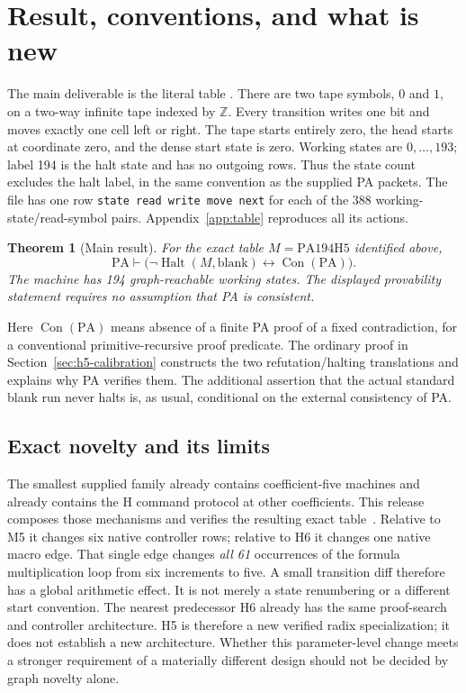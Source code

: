 \documentclass[11pt]{article}
\newtheorem{theorem}{Theorem}[section]
\theoremstyle{definition}\newtheorem{definition}[theorem]{Definition}
\newcommand{\PA}{\mathrm{PA}}
\newcommand{\file}[1]{\path{#1}}
\newcommand{\Con}{\operatorname{Con}}
\newcommand{\Halt}{\operatorname{Halt}}
\begin{document}
\section{Result, conventions, and what is new}

The main deliverable is the literal table \file{machine/machine.tm}.
There are two tape symbols, $0$ and $1$, on a two-way infinite tape indexed
by $\mathbb Z$. Every transition writes one bit and moves exactly one cell
left or right. The tape starts entirely zero, the head starts at coordinate
zero, and the dense start state is zero. Working states are $0,\ldots,193$;
label 194 is the halt state and has no outgoing rows. Thus the state count
excludes the halt label, in the same convention as the supplied PA packets.
The file has one row \texttt{state read write move next} for each of the
388 working-state/read-symbol pairs. Appendix~\ref{app:table} reproduces
all its actions.

\begin{theorem}[Main result]
For the exact table $M=\mathrm{PA194H5}$ identified above,
\[
 \PA\vdash\bigl(\neg\Halt(M,\mathrm{blank})
                  \longleftrightarrow\Con(\PA)\bigr).
\]
The machine has 194 graph-reachable working states. The displayed
provability statement requires no assumption that PA is consistent.
\end{theorem}

Here $\Con(\PA)$ means absence of a finite PA proof of a fixed
contradiction, for a conventional primitive-recursive proof predicate.
The ordinary proof in Section~\ref{sec:h5-calibration} constructs the two
refutation/halting translations and explains why PA verifies them. The
additional assertion that the actual standard blank run never halts is,
as usual, conditional on the external consistency of PA.

\subsection{Exact novelty and its limits}

The smallest supplied family already contains coefficient-five machines
and already contains the H command protocol at other coefficients.
This release composes those mechanisms and verifies the resulting exact
table~\cite{radix,h6}. Relative to M5 it changes six native controller rows; relative to
H6 it changes one native macro edge. That single edge changes \emph{all
61} occurrences of the formula multiplication loop from six increments
to five. A small transition diff therefore has a global arithmetic effect.
It is not merely a state renumbering or a different start convention.
The nearest predecessor H6 already has the same proof-search and
controller architecture. H5 is therefore a new verified radix
specialization; it does not establish a new architecture. Whether this
parameter-level change meets a stronger requirement of a materially
different design should not be decided by graph novelty alone.
\end{document}
